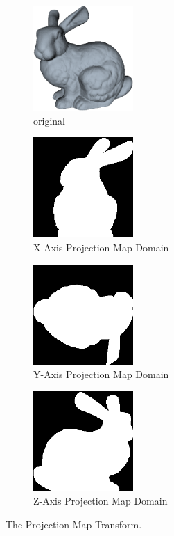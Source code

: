 \begin{figure}[!htb]
        \centering
        \begin{subfigure}[b]{1.5in}
                \includegraphics[width=1.5in]{images/ch2/bunny}
                \caption{original}
                \label{fig:bunnyOrigAA2}
        \end{subfigure}%
        \begin{subfigure}[b]{1.5in}
                \includegraphics[width=1.5in]{images/methodology/FVR/xaxis}
                \caption{X-Axis Projection Map Domain}
                \label{fig:xaxPMDOM}
        \end{subfigure}
        \begin{subfigure}[b]{1.5in}
                \includegraphics[width=1.5in]{images/methodology/FVR/yaxis}
                \caption{Y-Axis Projection Map Domain}
                \label{fig:yaxPMDOM}
        \end{subfigure}%
        \begin{subfigure}[b]{1.5in}
                \includegraphics[width=1.5in]{images/methodology/FVR/zaxis}
                \caption{Z-Axis Projection Map Domain}
                \label{fig:zaxPMDOM}
        \end{subfigure}
        \caption{The Projection Map Transform.}
       \label{fig:pmtExample}
\end{figure}

